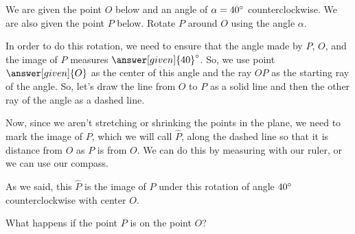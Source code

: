 \documentclass{ximera}
\begin{document}
\begin{example}
We are given the point $O$ below and an angle of $\alpha = 40\degree$ counterclockwise. We are also given the point $P$ below. Rotate $P$ around $O$ using the angle $\alpha$.
\begin{image}
\end{image}
In order to do this rotation, we need to ensure that the angle made by $P$, $O$, and the image of $P$ measures $\answer[given]{40}\degree$. So, we use point $\answer[given]{O}$ as the center of this angle and the ray $OP$ as the starting ray of the angle. So, let's draw the line from $O$ to $P$ as a solid line and then the other ray of the angle as a dashed line.
\begin{image}
\end{image}
Now, since we aren't stretching or shrinking the points in the plane, we need to mark the image of $P$, which we will call $\hat{P}$, along the dashed line so that it is   distance from $O$ as $P$ is from $O$. We can do this by measuring with our ruler, or we can use our compass.
\begin{image}
\end{image}
As we said, this $\hat{P}$ is the image of $P$ under this rotation of angle $40\degree$ counterclockwise with center $O$.
\end{example}

\begin{question}
What happens if the point $P$ is on the point $O$?
\begin{multipleChoice}
\end{multipleChoice}
\end{question}
\end{document}

